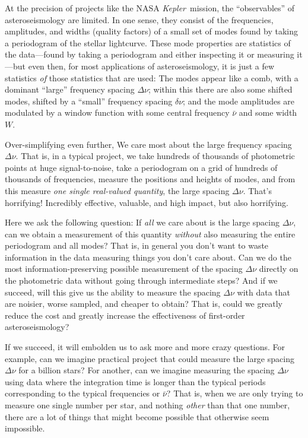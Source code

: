 \documentclass[12pt, letterpaper, preprint]{aastex}
\newcommand{\project}[1]{\textsl{#1}}
\newcommand{\kepler}{\project{Kepler}}
\newcommand{\frequency}{\nu}
\newcommand{\largedelta}{\Delta\frequency}
\newcommand{\smalldelta}{\delta\frequency}
\newcommand{\windowmean}{\bar{\frequency}}
\newcommand{\windowwidth}{W}
\begin{document}
At the precision of projects like the NASA \kepler\ mission,
the ``observables'' of asteroseismology are limited.
In one sense, they consist of the frequencies, amplitudes, and widths (quality factors)
of a small set of modes found by taking a periodogram of the stellar lightcurve.
These mode properties are statistics of the data---found by taking a periodogram
and either inspecting it or measuring it---but even then, for most applications of asteroseismology,
it is just a few statistics \emph{of} those statistics that are used:
The modes appear like a comb, with a dominant ``large'' frequency spacing $\largedelta$;
within this there are also some shifted modes, shifted by a ``small'' frequency spacing $\smalldelta$;
and the mode amplitudes are modulated by a window function with some central frequency $\windowmean$
and some width $\windowwidth$.

Over-simplifying even further, We care most about the large frequency spacing $\largedelta$.
That is, in a typical project, we take hundreds of thousands of photometric points at huge signal-to-noise,
take a periodogram on a grid of hundreds of thousands of frequencies,
measure the positions and heights of modes,
and from this measure \emph{one single real-valued quantity}, the large spacing $\largedelta$.
That's horrifying!
Incredibly effective, valuable, and high impact, but also horrifying.

Here we ask the following question:
If \emph{all} we care about is the large spacing $\largedelta$,
can we obtain a measurement of this quantity \emph{without} also measuring the entire periodogram and all modes?
That is, in general you don't want to waste information in the data measuring things you don't care about.
Can we do the most information-preserving possible measurement of the spacing $\largedelta$
directly on the photometric data without going through intermediate steps?
And if we succeed, will this give us the ability to measure the spacing $\largedelta$
with data that are noisier, worse sampled, and cheaper to obtain?
That is, could we greatly reduce the cost and greatly increase the effectiveness of
first-order asteroseismology?

If we succeed, it will embolden us to ask more and more crazy questions.
For example, can we imagine practical project that could measure the large spacing $\largedelta$
for a billion stars?
For another, can we imagine measuring the spacing $\largedelta$ using data where the
integration time is longer than the typical periods corresponding to the typical frequencies or $\windowmean$?
That is, when we are only trying to measure one single number per star,
and nothing \emph{other} than that one number,
there are a lot of things that might become possible that otherwise seem impossible.
\end{document}
